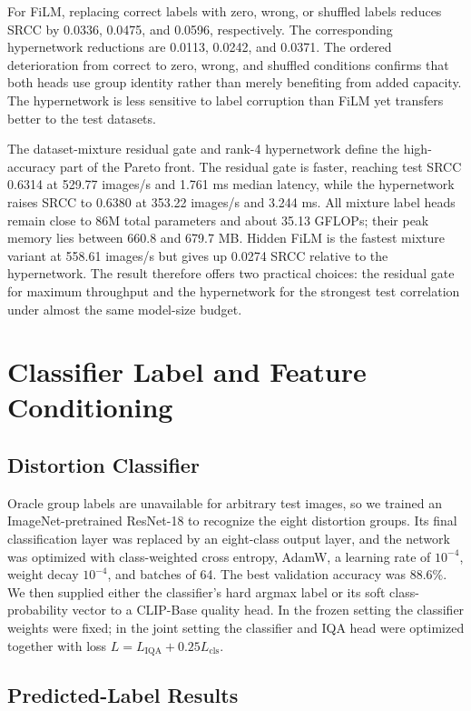 \documentclass{article}
\begin{document}
For FiLM, replacing correct labels with zero, wrong, or shuffled labels reduces SRCC by 0.0336, 0.0475, and 0.0596, respectively. The corresponding hypernetwork reductions are 0.0113, 0.0242, and 0.0371. The ordered deterioration from correct to zero, wrong, and shuffled conditions confirms that both heads use group identity rather than merely benefiting from added capacity. The hypernetwork is less sensitive to label corruption than FiLM yet transfers better to the test datasets.

The dataset-mixture residual gate and rank-4 hypernetwork define the high-accuracy part of the Pareto front. The residual gate is faster, reaching test SRCC 0.6314 at 529.77 images/s and 1.761 ms median latency, while the hypernetwork raises SRCC to 0.6380 at 353.22 images/s and 3.244 ms. All mixture label heads remain close to 86M total parameters and about 35.13 GFLOPs; their peak memory lies between 660.8 and 679.7 MB. Hidden FiLM is the fastest mixture variant at 558.61 images/s but gives up 0.0274 SRCC relative to the hypernetwork. The result therefore offers two practical choices: the residual gate for maximum throughput and the hypernetwork for the strongest test correlation under almost the same model-size budget.

\section{Classifier Label and Feature Conditioning}

\subsection{Distortion Classifier}

Oracle group labels are unavailable for arbitrary test images, so we trained an ImageNet-pretrained ResNet-18 to recognize the eight distortion groups. Its final classification layer was replaced by an eight-class output layer, and the network was optimized with class-weighted cross entropy, AdamW, a learning rate of $10^{-4}$, weight decay $10^{-4}$, and batches of 64. The best validation accuracy was 88.6\%. We then supplied either the classifier's hard argmax label or its soft class-probability vector to a CLIP-Base quality head. In the frozen setting the classifier weights were fixed; in the joint setting the classifier and IQA head were optimized together with loss $L=L_{\mathrm{IQA}}+0.25L_{\mathrm{cls}}$.

\subsection{Predicted-Label Results}
\end{document}
